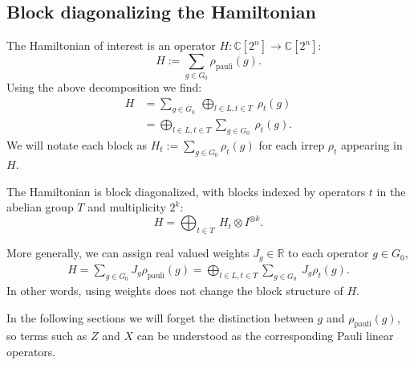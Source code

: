 \documentclass[11pt,oneside]{article}
\def\Complex{\mathbb{C}}
\def\R{\mathbb{R}}
\def\Ham{H}
\renewenvironment{framed}
{\begin{samepage}
\MakeFramed{\hsize0.8\linewidth\advance\hsize-\width\FrameRestore}}
{\endMakeFramed\end{samepage}}
\begin{document}
\subsection{Block diagonalizing the Hamiltonian}

The Hamiltonian of interest is 
an operator $\Ham:\Complex[2^n]\to\Complex[2^n]$:
$$ \Ham := \sum_{g\in G_0} \rho_{\mathrm{pauli}}(g).$$
Using the above decomposition we find:
\begin{align*}
    \Ham &= \sum_{g\in G_0}\ \bigoplus_{l\in L, t\in T}\ \rho_t(g)\\
         &= \bigoplus_{l\in L, t\in T} \sum_{g\in G_0}\ \rho_t(g).
\end{align*}
We will notate each block as
$\Ham_t := \sum_{g\in G_0}\rho_t(g)$
for each irrep $\rho_t$ appearing in $\Ham.$
\begin{framed}
\noindent
The Hamiltonian is block diagonalized, with blocks indexed by operators $t$ in
the abelian group $T$ and multiplicity $2^k:$
$$
    \Ham =  \bigoplus_{t\in T}\ \Ham_t \otimes I^{\otimes k}.
$$
\end{framed}

More generally, we can assign real valued weights
$J_g\in\R$
to each operator $g\in G_0,$
\begin{align*}
    \Ham = \sum_{g\in G_0} J_g \rho_{\mathrm{pauli}}(g)
            = \bigoplus_{l\in L, t\in T} \sum_{g\in G_0}\ J_g \rho_t(g).
\end{align*}
In other words, using weights does not change the block structure of $\Ham.$

In the following sections we will forget the distinction 
between $g$ and $\rho_{\mathrm{pauli}}(g)$,
so terms such as $Z$ and $X$ can be understood
as the corresponding Pauli linear operators.

%
%
\end{document}
